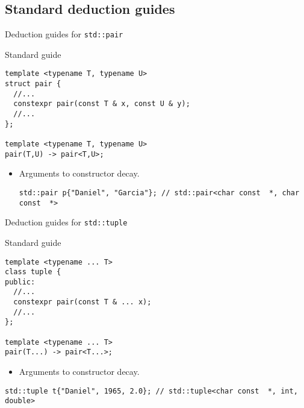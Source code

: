 \subsection{Standard deduction guides}

\begin{frame}[t,fragile]{Deduction guides for \texttt{std::pair}}
\begin{block}{Standard guide}
\begin{lstlisting}
template <typename T, typename U>
struct pair {
  //...
  constexpr pair(const T & x, const U & y);
  //...
};

template <typename T, typename U>
pair(T,U) -> pair<T,U>;
\end{lstlisting}
\end{block}

\begin{itemize}
  \item Arguments to  constructor decay.
\begin{lstlisting}
std::pair p{"Daniel", "Garcia"}; // std::pair<char const  *, char const  *>
\end{lstlisting}
\end{itemize}

\end{frame}

\begin{frame}[t,fragile]{Deduction guides for \texttt{std::tuple}}
\begin{block}{Standard guide}
\begin{lstlisting}
template <typename ... T>
class tuple {
public:
  //...
  constexpr pair(const T & ... x);
  //...
};

template <typename ... T>
pair(T...) -> pair<T...>;
\end{lstlisting}
\end{block}

\begin{itemize}
  \item Arguments to  constructor decay.
\end{itemize}
\begin{lstlisting}
std::tuple t{"Daniel", 1965, 2.0}; // std::tuple<char const  *, int, double>
\end{lstlisting}
\end{frame}

